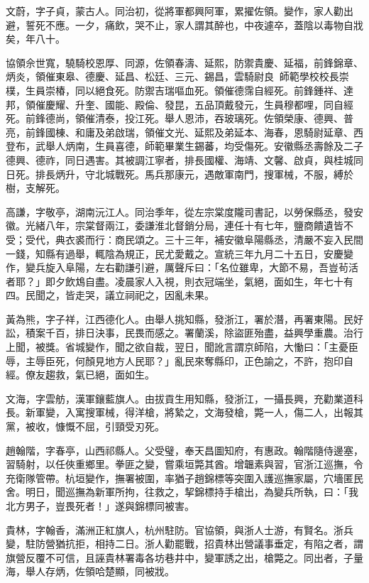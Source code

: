 \begin{pinyinscope}
文蔚，字子貞，蒙古人。同治初，從將軍都興阿軍，累擢佐領。變作，家人勸出避，誓死不應。一夕，痛飲，哭不止，家人謂其醉也，中夜遽卒，蓋陰以毒物自戕矣，年八十。

協領佘世寬，驍騎校恩厚、同源，佐領春濤、延熙，防禦貴慶、延福，前鋒錦章、炳炎，領催東皋、德慶、延昌、松廷、三元、錫昌，雲騎尉良，師範學校校長崇樸，生員崇椿，同以絕食死。防禦吉瑞嘔血死。領催德霈自經死。前鋒鍾祥、達邦，領催慶耀、升奎、國能、殿倫、發昆，五品頂戴發元，生員穆都哩，同自經死。前鋒德尚，領催清泰，投江死。舉人恩沛，吞玻璃死。佐領榮康、德興、普亮，前鋒國棟、和庸及弟啟瑞，領催文光、延熙及弟延本、海春，恩騎尉延章、西登布，武舉人炳南，生員喜德，師範畢業生錫蕃，均受傷死。安徽縣丞壽餘及二子德興、德祚，同日遇害。其被調江寧者，排長國權、海靖、文馨、啟貞，與桂城同日死。排長炳升，守北城戰死。馬兵那康元，遇敵軍南門，搜軍械，不服，縛於樹，支解死。

高謙，字敬亭，湖南沅江人。同治季年，從左宗棠度隴司書記，以勞保縣丞，發安徽。光緒八年，宗棠督兩江，委謙淮北督銷分局，連任十有七年，鹽商饋遺皆不受；受代，典衣裘而行：商民頌之。三十三年，補安徽阜陽縣丞，清嚴不妄入民間一錢，知縣有過舉，輒陰為規正，民尤愛戴之。宣統三年九月二十五日，安慶變作，變兵旋入阜陽，左右勸謙引避，厲聲斥曰：「名位雖卑，大節不易，吾豈茍活者耶？」即夕飲鴆自盡。凌晨家人入視，則衣冠端坐，氣絕，面如生，年七十有四。民聞之，皆走哭，議立祠祀之，因亂未果。

黃為熊，字子祥，江西德化人。由舉人挑知縣，發浙江，署於潛，再署東陽。民好訟，積案千百，排日決事，民畏而感之。署蘭溪，除盜匪殆盡，益興學重農。治行上聞，被獎。省城變作，聞之欲自裁，翌日，聞訛言謂京師陷，大慟曰：「主憂臣辱，主辱臣死，何顏見地方人民耶？」亂民來奪縣印，正色諭之，不許，抱印自經。僚友趨救，氣已絕，面如生。

文海，字雲舫，漢軍鑲藍旗人。由拔貢生用知縣，發浙江，一攝長興，充勸業道科長。新軍變，入寓搜軍械，得洋槍，將縶之，文海發槍，斃一人，傷二人，出報其黨，被收，慷慨不屈，引頸受刃死。

趙翰階，字春亭，山西祁縣人。父受璧，奉天昌圖知府，有惠政。翰階隨侍邊塞，習騎射，以任俠重鄉里。拳匪之變，嘗乘垣斃其酋。增韞素與習，官浙江巡撫，令充衛隊管帶。杭垣變作，撫署被圍，率猶子趙錦標等突圍入護巡撫家屬，穴墻匿民舍。明日，聞巡撫為新軍所拘，往救之，挈錦標持手槍出，為變兵所執，曰：「我北方男子，豈畏死者！」遂與錦標同被害。

貴林，字翰香，滿洲正紅旗人，杭州駐防。官協領，與浙人士游，有賢名。浙兵變，駐防營猶抗拒，相持二日。浙人勸罷戰，招貴林出營議事垂定，有陷之者，謂旗營反覆不可信，且誣貴林署毒各坊巷井中，變軍誘之出，槍斃之。同出者，子量海，舉人存炳，佐領哈楚顯，同被戕。


\end{pinyinscope}

